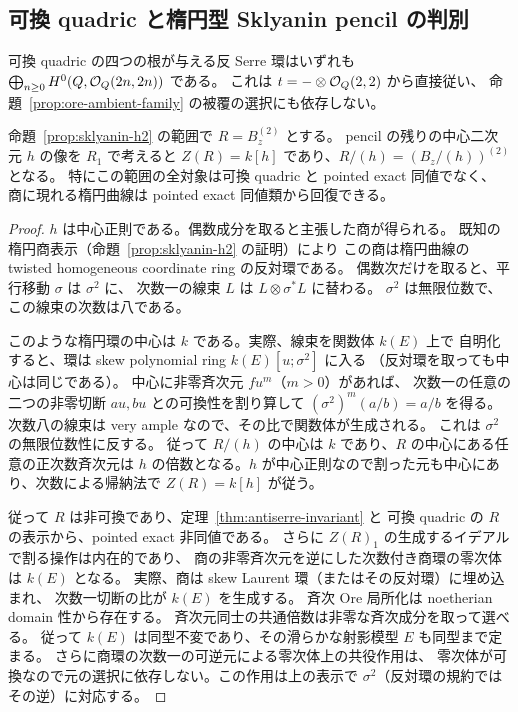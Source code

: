 \subsection{可換 quadric と楕円型 Sklyanin pencil の判別}

可換 quadric の四つの根が与える反 Serre 環はいずれも
$\bigoplus_{n\ge0} H^0(Q,\mathcal O_Q(2n,2n))$ である。
これは $t=-\otimes\mathcal O_Q(2,2)$ から直接従い、
命題~\ref{prop:ore-ambient-family} の被覆の選択にも依存しない。

\begin{proposition}
\label{prop:sklyanin-antiserre-center}
命題~\ref{prop:sklyanin-h2} の範囲で $R=B_z^{(2)}$ とする。
pencil の残りの中心二次元 $h$ の像を $R_1$ で考えると
$Z(R)=k[h]$ であり、$R/(h)=(B_z/(h))^{(2)}$ となる。
特にこの範囲の全対象は可換 quadric と pointed exact 同値でなく、
商に現れる楕円曲線は pointed exact 同値類から回復できる。
\end{proposition}
\begin{proof}
$h$ は中心正則である。偶数成分を取ると主張した商が得られる。
既知の楕円商表示（命題~\ref{prop:sklyanin-h2} の証明）により
この商は楕円曲線の twisted homogeneous coordinate ring の反対環である。
偶数次だけを取ると、平行移動 $\sigma$ は $\sigma^2$ に、
次数一の線束 $L$ は $L\otimes\sigma^*L$ に替わる。
$\sigma^2$ は無限位数で、この線束の次数は八である。

このような楕円環の中心は $k$ である。実際、線束を関数体 $k(E)$ 上で
自明化すると、環は skew polynomial ring $k(E)[u;\sigma^2]$ に入る
（反対環を取っても中心は同じである）。
中心に非零斉次元 $f u^m$（$m>0$）があれば、
次数一の任意の二つの非零切断 $a u,b u$ との可換性を割り算して
$(\sigma^2)^m(a/b)=a/b$ を得る。
次数八の線束は very ample なので、その比で関数体が生成される。
これは $\sigma^2$ の無限位数性に反する。
従って $R/(h)$ の中心は $k$ であり、$R$ の中心にある任意の正次数斉次元は
$h$ の倍数となる。$h$ が中心正則なので割った元も中心にあり、次数による帰納法で
$Z(R)=k[h]$ が従う。

従って $R$ は非可換であり、定理~\ref{thm:antiserre-invariant} と
可換 quadric の $R$ の表示から、pointed exact 非同値である。
さらに $Z(R)_1$ の生成するイデアルで割る操作は内在的であり、
商の非零斉次元を逆にした次数付き商環の零次体は $k(E)$ となる。
実際、商は skew Laurent 環（またはその反対環）に埋め込まれ、
次数一切断の比が $k(E)$ を生成する。
斉次 Ore 局所化は noetherian domain 性から存在する。
斉次元同士の共通倍数は非零な斉次成分を取って選べる。
従って $k(E)$ は同型不変であり、その滑らかな射影模型 $E$ も同型まで定まる。
さらに商環の次数一の可逆元による零次体上の共役作用は、
零次体が可換なので元の選択に依存しない。この作用は上の表示で
$\sigma^2$（反対環の規約ではその逆）に対応する。
\end{proof}
